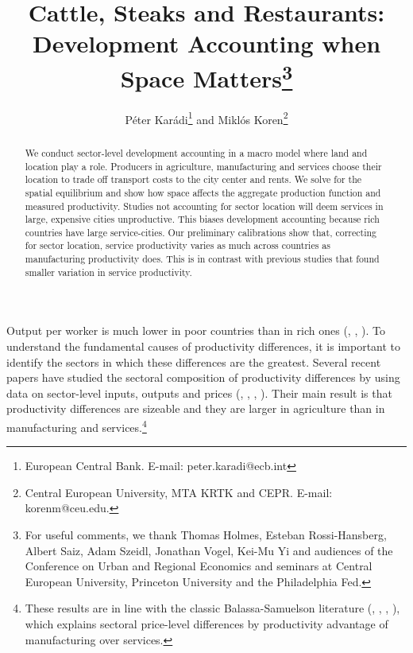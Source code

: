\documentclass[12pt]{article}
\begin{document}
\title{Cattle, Steaks and Restaurants:\\ Development Accounting when Space Matters\thanks{For useful comments, we thank Thomas Holmes, Esteban Rossi-Hansberg, Albert Saiz, Adam Szeidl, Jonathan Vogel, Kei-Mu Yi and audiences of the Conference on Urban and Regional Economics and seminars at Central European University, Princeton University and the Philadelphia Fed.}}
\author{Péter Karádi\thanks{European Central Bank. E-mail: peter.karadi@ecb.int} and Miklós Koren\thanks{Central European University, MTA KRTK and CEPR. E-mail: korenm@ceu.edu.}}
\maketitle

\begin{abstract}
We conduct sector-level development accounting in a macro model where land and location play a role. Producers in agriculture, manufacturing and services choose their location to trade off transport costs to the city center and rents. We solve for the spatial equilibrium and show how space affects the aggregate production function and measured productivity. Studies not accounting for sector location will deem services in large, expensive cities unproductive. This biases development accounting because rich countries have large service-cities. Our preliminary calibrations show that, correcting for sector location, service productivity varies as much across countries as manufacturing productivity does. This is in contrast with previous studies that found smaller variation in service productivity.
\end{abstract}

Output per worker is much lower in poor countries than in rich ones (, , ). To understand the fundamental causes of productivity differences, it is important to identify the sectors in which these differences are the greatest. Several recent papers have studied the sectoral composition of productivity differences by using data on sector-level inputs, outputs and prices (, , , ). Their main result is that productivity differences are sizeable and they are larger in agriculture than in manufacturing and services.\footnote{These results are in line with the classic Balassa-Samuelson literature (, , , ), which explains sectoral price-level differences by productivity advantage of manufacturing over services.}
\end{document}
